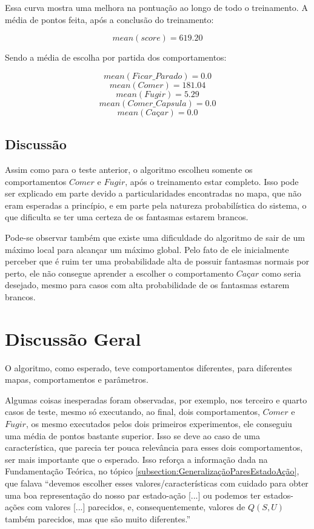 Essa curva mostra uma melhora na pontuação ao longo de todo o treinamento. A média de pontos feita, após a conclusão do treinamento:

$$ mean \left( score \right) = 619.20 $$

Sendo a média de escolha por partida dos comportamentos:

$$ mean \left( Ficar\_Parado \right) = 0.0 $$
$$ mean \left( Comer \right) = 181.04 $$
$$ mean \left( Fugir \right) = 5.29 $$
$$ mean \left( Comer\_Capsula \right) = 0.0 $$
$$ mean \left( \textit{Caçar} \right) = 0.0 $$


\subsection{Discussão}

Assim como para o teste anterior, o algoritmo escolheu somente os comportamentos $ Comer $ e $ Fugir $, após o treinamento estar completo. Isso pode ser explicado em parte devido a particularidades encontradas no mapa, que não eram esperadas a princípio, e em parte pela natureza probabilística do sistema, o que dificulta se ter uma certeza de os fantasmas estarem brancos.

Pode-se observar também que existe uma dificuldade do algoritmo de sair de um máximo local para alcançar um máximo global. Pelo fato de ele inicialmente perceber que é ruim ter uma probabilidade alta de possuir fantasmas normais por perto, ele não consegue aprender a escolher o comportamento $ \textit{Caçar} $ como seria desejado, mesmo para casos com alta probabilidade de os fantasmas estarem brancos.

\section{Discussão Geral}

O algoritmo, como esperado, teve comportamentos diferentes, para diferentes mapas, comportamentos e parâmetros.

Algumas coisas inesperadas foram observadas, por exemplo, nos terceiro e quarto casos de teste, mesmo só executando, ao final, dois comportamentos, $ Comer $ e $ Fugir $, os mesmo executados pelos dois primeiros experimentos, ele conseguiu uma média de pontos bastante superior. Isso se deve ao caso de uma característica, que parecia ter pouca relevância para esses dois comportamentos, ser mais importante que o esperado. Isso reforça a informação dada na Fundamentação Teórica, no tópico \ref{subsection:GeneralizaçãoParesEstadoAção}, que falava ``devemos escolher esses valores/características com cuidado para obter uma boa representação do nosso par estado-ação [...] ou podemos ter estados-ações com valores [...] parecidos, e, consequentemente, valores de $ Q \left( S, U \right) $ também parecidos, mas que são muito diferentes.''

